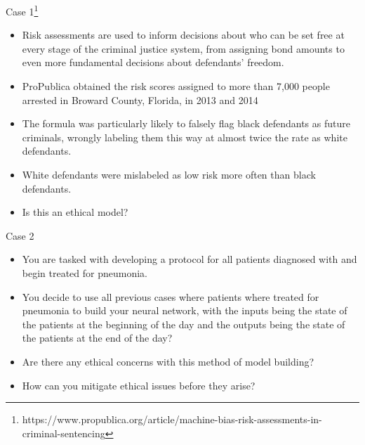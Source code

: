 \documentclass[10pt, xcolor=table]{beamer}
\begin{document}
\begin{frame}{Case 1\footnote{https://www.propublica.org/article/machine-bias-risk-assessments-in-criminal-sentencing}}
	\begin{itemize}
		\item Risk assessments are used to inform decisions about who can be set free at every stage of the criminal justice system, from assigning bond amounts to even more fundamental decisions about defendants' freedom. 
		\item ProPublica obtained the risk scores assigned to more than 7,000 people arrested in Broward County, Florida, in 2013 and 2014 
		\item The formula was particularly likely to falsely flag black defendants as future criminals, wrongly labeling them this way at almost twice the rate as white defendants.
		\item White defendants were mislabeled as low risk more often than black defendants.
		\item Is this an ethical model?
	\end{itemize}
\end{frame}

\begin{frame}{Case 2}
	\begin{itemize}
		\item You are tasked with developing a protocol for all patients diagnosed with and begin treated for pneumonia.
		\item You decide to use all previous cases where patients where treated for pneumonia to build your neural network, with the inputs being the state of the patients at the beginning of the day and the outputs being the state of the patients at the end of the day?
		\item Are there any ethical concerns with this method of model building?
		\item How can you mitigate ethical issues before they arise?
	\end{itemize}
\end{frame}

\end{document}
